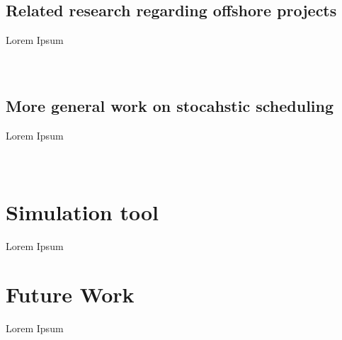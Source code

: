 \documentclass[a4paper,12pt]{article}
\begin{document}
\bigskip

\cite{kerkhove2017optimised} \\
\cite{barlow2017using}

\subsection{Related research regarding offshore projects} \label{ss:offsh}
Lorem Ipsum \\
\cite{barlow2014assessment} \\
\cite{barlow2014support} \\
\cite{leggate2010crew}

\subsection{More general work on stocahstic scheduling} \label{ss:stoch}
Lorem Ipsum \\
\cite{herroelen2005project} \\
\cite{sevaux2002genetic} \\
\cite{artigues2000polynomial}

\pagebreak

\section{Simulation tool} \label{s:sim}
Lorem Ipsum

\pagebreak

\section{Future Work} \label{s:concl}
Lorem Ipsum

\pagebreak



\end{document}
